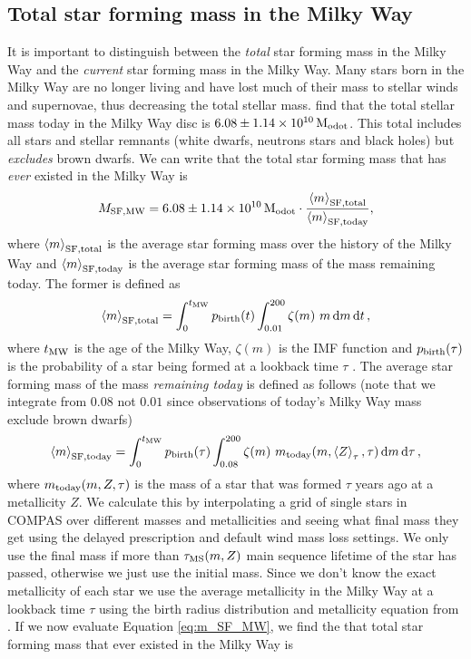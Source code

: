 \subsection{Total star forming mass in the Milky Way}
It is important to distinguish between the \textit{total} star forming mass in the Milky Way and the \textit{current} star forming mass in the Milky Way. Many stars born in the Milky Way are no longer living and have lost much of their mass to stellar winds and supernovae, thus decreasing the total stellar mass. \citet{Licquia+2015} find that the total stellar mass today in the Milky Way disc is $6.08 \pm 1.14 \times 10^{10} \unit{M_{\rm odot}}$. This total includes all stars and stellar remnants (white dwarfs, neutrons stars and black holes) but \textit{excludes} brown dwarfs. We can write that the total star forming mass that has \textit{ever} existed in the Milky Way is
\begin{equation}\label{eq:m_SF_MW}
    M_{\rm SF, MW} = 6.08 \pm 1.14 \times 10^{10} \unit{M_{\rm odot}} \cdot \frac{\avg{m}_{\rm SF, total}}{\avg{m}_{\rm SF, today}},
\end{equation}
where $\left\langle m\right\rangle_{\rm SF, total}$ is the average star forming mass over the history of the Milky Way and $\left\langle m\right\rangle_{\rm SF, today}$ is the average star forming mass of the mass remaining today. The former is defined as
\begin{equation}
    \avg{m}_{\rm SF, total} = \int_{0}^{t_{\rm MW}} p_{\rm birth}(t) \int_{0.01}^{200} \zeta(m)\ m \dd{m} \dd{t},
\end{equation}
where $t_{\rm MW}$ is the age of the Milky Way, $\zeta(m)$ is the \citet{Kroupa+2001} IMF function and $p_{\rm birth}(\tau)$ is the probability of a star being formed at a lookback time $\tau$ \citep[][Eq.\,4]{Frankel+2018}. The average star forming mass of the mass \textit{remaining today} is defined as follows (note that we integrate from $0.08$ not $0.01$ since observations of today's Milky Way mass exclude brown dwarfs)
\begin{equation}
    \avg{m}_{\rm SF, today} = \int_{0}^{t_{\rm MW}} p_{\rm birth}(\tau) \int_{0.08}^{200} \zeta(m)\ m_{\rm today}(m, \avg{Z}_\tau, \tau) \dd{m} \dd{\tau},
\end{equation}
where $m_{\rm today}(m, Z, \tau)$ is the mass of a star that was formed $\tau$ years ago at a metallicity $Z$. We calculate this by interpolating a grid of single stars in COMPAS over different masses and metallicities and seeing what final mass they get using the \citet{Fryer+2012} delayed prescription and default wind mass loss settings. We only use the final mass if more than $\tau_{\rm MS}(m, Z)$ main sequence lifetime of the star has passed, otherwise we just use the initial mass. Since we don't know the exact metallicity of each star we use the average metallicity in the Milky Way at a lookback time $\tau$ using the birth radius distribution and metallicity equation from \citet{Frankel+2018}. If we now evaluate Equation \ref{eq:m_SF_MW}, we find the that total star forming mass that ever existed in the Milky Way is
